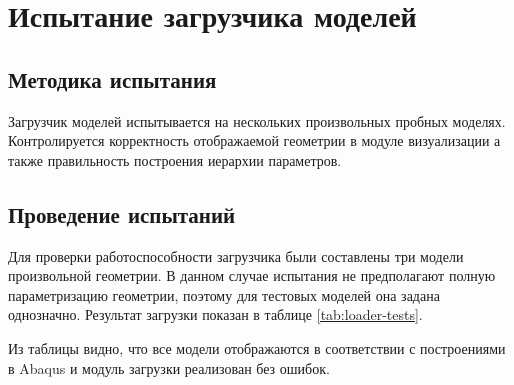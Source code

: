 \documentclass[14pt,oneside,final]{extreport}
\begin{document}
	
	\section{Испытание загрузчика моделей}
	\subsection{Методика испытания}
	Загрузчик моделей испытывается на нескольких произвольных пробных моделях. Контролируется корректность отображаемой геометрии в модуле визуализации а также правильность построения иерархии параметров.

	\subsection{Проведение испытаний}
	Для проверки работоспособности загрузчика были составлены три модели произвольной геометрии. В данном случае испытания не предполагают полную параметризацию геометрии, поэтому для тестовых моделей она задана однозначно. Результат загрузки показан в таблице \ref{tab:loader-tests}.   
	
	Из таблицы видно, что все модели отображаются в соответствии с построениями в Abaqus и модуль загрузки реализован без ошибок.
	
\end{document}
